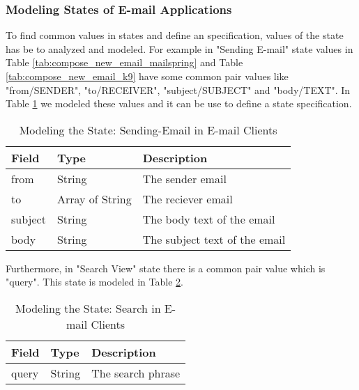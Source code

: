 \subsubsection{Modeling States of E-mail Applications}
To find common values in states and define an specification, values of the state has be to analyzed and modeled. For example in "Sending E-mail" state values in Table \ref{tab:compose_new_email_mailspring} and Table \ref{tab:compose_new_email_k9} have some common pair values like "from/SENDER", "to/RECEIVER", "subject/SUBJECT" and "body/TEXT". In Table \ref{tab:email-model} we modeled these values and it can be use to define a state specification. 


\FloatBarrier\FloatBarrier \begin{table}[H]
\centering
\begin{tabular}{lll}
Field   & Type   & Description                    \\ 
\hline
from    & String & The sender email               \\
to      & Array of String  & The reciever email             \\
subject & String & The body text of the email     \\
body    & String & The subject text of the email 
\end{tabular}
\caption{Modeling the State: Sending-Email in E-mail Clients}
\label{tab:email-model}
\end{table} \FloatBarrier


Furthermore, in "Search View" state there is a common pair value which is "query". This state is modeled in Table \ref{tab:search-model}.


\FloatBarrier
\begin{table}[H]
\centering
\begin{tabular}{lll}
Field & Type   & Description        \\ 
\hline
query & String & The search phrase 
\end{tabular}
\caption{Modeling the State: Search in E-mail Clients}
\label{tab:search-model}
\end{table}
\FloatBarrier



